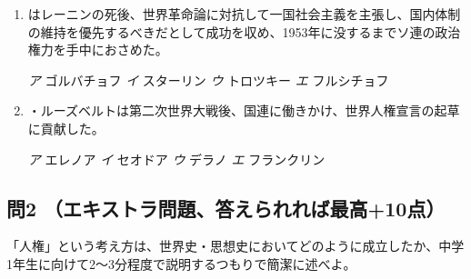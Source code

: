 \documentclass[uplatex,dvipdfmx]{jsarticle}
\newcommand{\sentakusi}[4]{
\hspace{.3zw}
\emph{ア}\hspace{1zw} #1 \hspace{2zw} \emph{イ} \hspace{1zw}#2 \hspace{2zw}\emph{ウ}\hspace{1zw} #3 \hspace{2zw}\emph{エ}\hspace{1zw} #4

}
\begin{document}
\begin{enumerate}
\item {}はレーニンの死後、世界革命論に対抗して一国社会主義を主張し、国内体制の維持を優先するべきだとして成功を収め、1953年に没するまでソ連の政治権力を手中におさめた。

\sentakusi
{ゴルバチョフ}
{スターリン}
{トロツキー}
{フルシチョフ}


\item   {}・ルーズベルトは第二次世界大戦後、国連に働きかけ、世界人権宣言の起草に貢献した。

\sentakusi
{エレノア}
{セオドア}
{デラノ}
{フランクリン}







\end{enumerate}







\subsection*{問2 （エキストラ問題、答えられれば最高+10点） }
「人権」という考え方は、世界史・思想史においてどのように成立したか、中学1年生に向けて2〜3分程度で説明するつもりで簡潔に述べよ。
\end{document}
